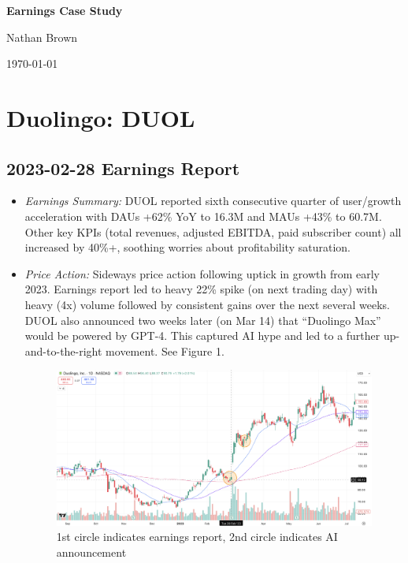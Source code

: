 \documentclass[11pt]{article}
\begin{document}
\begin{center}
    \vspace*{0.5cm}
    {\Huge\bfseries Earnings Case Study\par}
    \vspace{0.8cm}
    {\large Nathan Brown\par}
    {\large \today\par}
    \vspace{1cm}
\end{center}

\tableofcontents
\newpage

\section{Duolingo: DUOL}
    \subsection{2023-02-28 Earnings Report}
        \begin{itemize}
            \item \textit{Earnings Summary:} DUOL reported sixth consecutive quarter of user/growth acceleration with DAUs +62\% YoY to 16.3M and MAUs +43\% to 60.7M. Other key KPIs (total revenues, adjusted EBITDA, paid subscriber count) all increased by 40\%+, soothing worries about profitability saturation.
            \item \textit{Price Action:} Sideways price action following uptick in growth from early 2023. Earnings report led to heavy 22\% spike (on next trading day) with heavy (4x) volume followed by consistent gains over the next several weeks. DUOL also announced two weeks later (on Mar 14) that ``Duolingo Max'' would be powered by GPT-4. This captured AI hype and led to a further up-and-to-the-right movement. See Figure 1.
            \begin{figure}[h]
                \centering
                \includegraphics[width=0.8\linewidth]{images/DUOL1.png}
                \caption{1st circle indicates earnings report, 2nd circle indicates AI announcement}
            \end{figure}
        \end{itemize}
\end{document}
